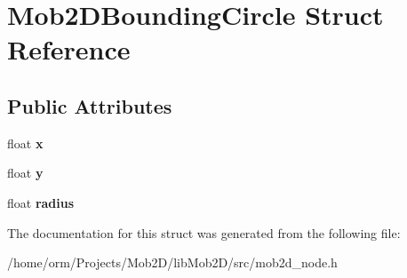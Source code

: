 \hypertarget{structMob2DBoundingCircle}{
\section{Mob2DBoundingCircle Struct Reference}
\label{structMob2DBoundingCircle}
}
\subsection*{Public Attributes}
\begin{DoxyCompactItemize}
\item 
\hypertarget{structMob2DBoundingCircle_afa06a83a62ae5472b8c61a53eba9329b}{
float {\bfseries x}}
\label{structMob2DBoundingCircle_afa06a83a62ae5472b8c61a53eba9329b}

\item 
\hypertarget{structMob2DBoundingCircle_a540e4b9cf7466d178fcf909d4378d928}{
float {\bfseries y}}
\label{structMob2DBoundingCircle_a540e4b9cf7466d178fcf909d4378d928}

\item 
\hypertarget{structMob2DBoundingCircle_a644349d9ff2cc03a098277680e70123a}{
float {\bfseries radius}}
\label{structMob2DBoundingCircle_a644349d9ff2cc03a098277680e70123a}

\end{DoxyCompactItemize}


The documentation for this struct was generated from the following file:\begin{DoxyCompactItemize}
\item 
/home/orm/Projects/Mob2D/libMob2D/src/mob2d\_\-node.h\end{DoxyCompactItemize}
